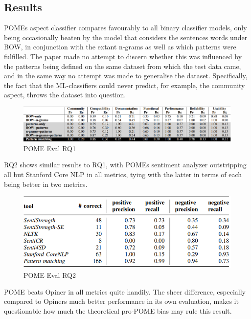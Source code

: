 \documentclass[a4paper,10pt, bibliography=totocnumbered]{scrreprt}
\begin{document}
\subsection{Results}

POMEs aspect classifier compares favourably to all binary classifier models, only being occasionally beaten by the model that considers the sentences words under BOW, in conjunction with the extant n-grams as well as which patterns were fulfilled. The paper made no attempt to discern whether this was influenced by the patterns being defined on the same dataset from which the test data came, and in the same way no attempt was made to generalise the dataset. Specifically, the fact that the ML-classifiers could never predict, for example, the community aspect, throws the dataset into question.

\begin{figure}[!h]
    \centering
    \includegraphics[scale=0.4]{../images/Thema9_POMEEval1.PNG}
    \caption{POME Eval RQ1}
    \label{POMEEval1}
\end{figure}

RQ2 shows similar results to RQ1, with POMEs sentiment analyzer outstripping all but Stanford Core NLP in all metrics, tying with the latter in terms of each being better in two metrics.

\begin{figure}[!h]
    \centering
    \includegraphics[scale=0.6]{../images/Thema9_POMEEval2.PNG}
    \caption{POME Eval RQ2}
    \label{POMEEval2}
\end{figure}

POME beats Opiner in all metrics quite handily. The sheer difference, especially compared to Opiners much better performance in its own evaluation, makes it questionable how much the theoretical pro-POME bias may rule this result.
\end{document}
